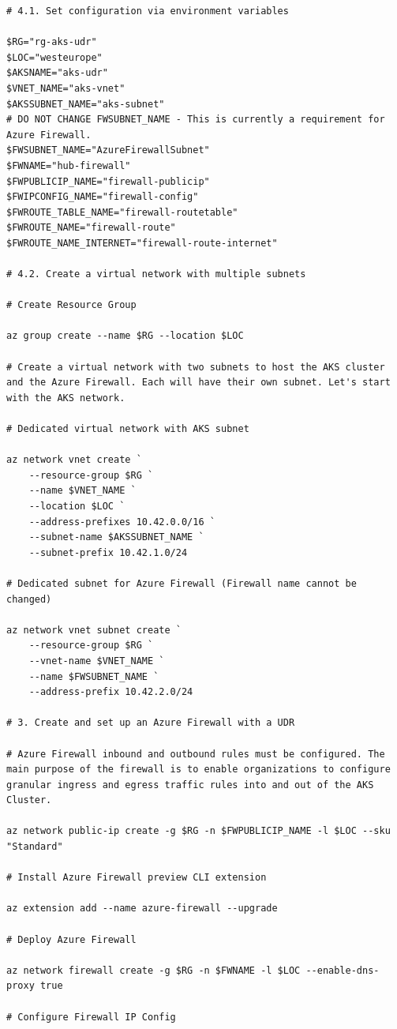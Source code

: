 \documentclass[
]{article}
\begin{document}
\begin{lstlisting}
# 4.1. Set configuration via environment variables

$RG="rg-aks-udr"
$LOC="westeurope"
$AKSNAME="aks-udr"
$VNET_NAME="aks-vnet"
$AKSSUBNET_NAME="aks-subnet"
# DO NOT CHANGE FWSUBNET_NAME - This is currently a requirement for Azure Firewall.
$FWSUBNET_NAME="AzureFirewallSubnet"
$FWNAME="hub-firewall"
$FWPUBLICIP_NAME="firewall-publicip"
$FWIPCONFIG_NAME="firewall-config"
$FWROUTE_TABLE_NAME="firewall-routetable"
$FWROUTE_NAME="firewall-route"
$FWROUTE_NAME_INTERNET="firewall-route-internet"

# 4.2. Create a virtual network with multiple subnets

# Create Resource Group

az group create --name $RG --location $LOC

# Create a virtual network with two subnets to host the AKS cluster and the Azure Firewall. Each will have their own subnet. Let's start with the AKS network.

# Dedicated virtual network with AKS subnet

az network vnet create `
    --resource-group $RG `
    --name $VNET_NAME `
    --location $LOC `
    --address-prefixes 10.42.0.0/16 `
    --subnet-name $AKSSUBNET_NAME `
    --subnet-prefix 10.42.1.0/24

# Dedicated subnet for Azure Firewall (Firewall name cannot be changed)

az network vnet subnet create `
    --resource-group $RG `
    --vnet-name $VNET_NAME `
    --name $FWSUBNET_NAME `
    --address-prefix 10.42.2.0/24

# 3. Create and set up an Azure Firewall with a UDR

# Azure Firewall inbound and outbound rules must be configured. The main purpose of the firewall is to enable organizations to configure granular ingress and egress traffic rules into and out of the AKS Cluster.

az network public-ip create -g $RG -n $FWPUBLICIP_NAME -l $LOC --sku "Standard"

# Install Azure Firewall preview CLI extension

az extension add --name azure-firewall --upgrade

# Deploy Azure Firewall

az network firewall create -g $RG -n $FWNAME -l $LOC --enable-dns-proxy true

# Configure Firewall IP Config


\end{lstlisting}
\end{document}
